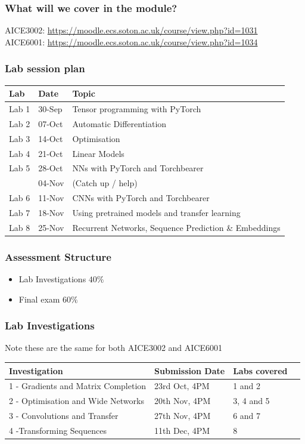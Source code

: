 \documentclass[]{article}
\begin{document}
\begin{frame}
	\frametitle{What will we cover in the module?}

	AICE3002: \url{https://moodle.ecs.soton.ac.uk/course/view.php?id=1031} \\[1em]
	AICE6001: \url{https://moodle.ecs.soton.ac.uk/course/view.php?id=1034}
\end{frame}

\begin{frame}
	\frametitle{Lab session plan}

	\begin{center}
	\begin{tabular}{ l l l }
		 Lab & Date & Topic \\ \hline
		 Lab 1  & 30-Sep & Tensor programming with PyTorch \\
		 Lab 2  & 07-Oct & Automatic Differentiation \\
		 Lab 3  & 14-Oct & Optimisation \\
		 Lab 4  & 21-Oct & Linear Models \\
 		 Lab 5  & 28-Oct & NNs with PyTorch and Torchbearer \\
 		        & 04-Nov & (Catch up / help) \\
 		 Lab 6  & 11-Nov & CNNs with PyTorch and Torchbearer \\
     Lab 7  & 18-Nov & Using pretrained models and transfer learning \\
     Lab 8  & 25-Nov & Recurrent Networks, Sequence Prediction \& Embeddings \\
	\end{tabular}
	\end{center}
\end{frame}


\begin{frame}
	\frametitle{Assessment Structure}
	\begin{itemize}
		\item Lab Investigations $40\%$
		\item Final exam $60\%$
	\end{itemize}
\end{frame}

\begin{frame}
	\frametitle{Lab Investigations}

	Note these are the same for both AICE3002 and AICE6001

	\begin{center}
	\begin{tabular}{ l l l l }
		 Investigation & Submission Date & Labs covered \\ \hline
		 1 - Gradients and Matrix Completion & 23rd Oct, 4PM & 1 and 2 \\
		 2 - Optimisation and Wide Networks & 20th Nov, 4PM & 3, 4 and 5 \\
		 3 - Convolutions and Transfer & 27th Nov, 4PM & 6 and 7 \\
		 4 -Transforming Sequences & 11th Dec, 4PM & 8 \\
	\end{tabular}
	\end{center}
\end{frame}
\end{document}
